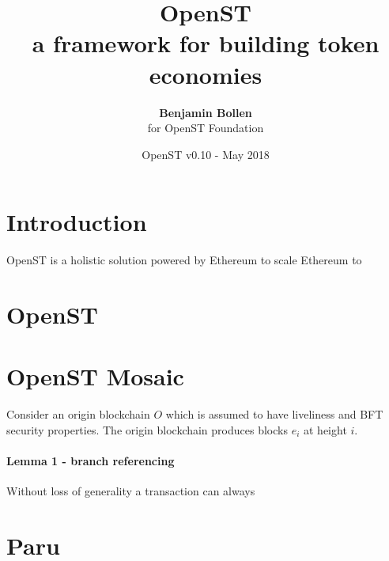 \documentclass[12pt,a4paper, twocolumn]{article}
\title{{\sc OpenST\\ \Large{a framework for building token economies}}}
\author{\textbf{Benjamin Bollen}\\ for OpenST Foundation}
\date{OpenST v0.10 - May 2018}
\begin{document}
\maketitle
{}

\maketitle

\section{Introduction}

OpenST is a holistic solution powered by Ethereum to scale Ethereum to 

\section{OpenST}

\section{OpenST Mosaic}

Consider an origin blockchain $O$ which is assumed to have liveliness and BFT security properties.  The origin blockchain produces blocks $e_i$ at height $i$.

\paragraph{Lemma 1 - branch referencing} Without loss of generality a transaction can always 

\section{Paru}
\end{document}
